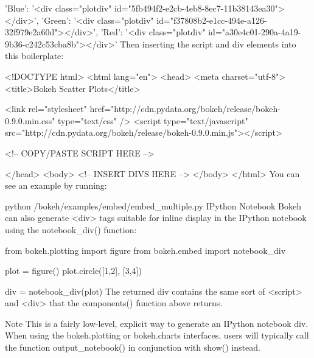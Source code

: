 {'Blue': '<div class="plotdiv" id="5fb494f2-e2cb-4eb8-8ec7-11b38143ea30"></div>', 'Green': '<div class="plotdiv" id="f37808b2-e1cc-494e-a126-32f979e2a60d"></div>', 'Red': '<div class="plotdiv" id="a30e4c01-290a-4a19-9b36-c242c53cba8b"></div>'}
Then inserting the script and div elements into this boilerplate:

<!DOCTYPE html>
<html lang="en">
    <head>
        <meta charset="utf-8">
        <title>Bokeh Scatter Plots</title>

        <link rel="stylesheet" href="http://cdn.pydata.org/bokeh/release/bokeh-0.9.0.min.css" type="text/css" />
        <script type="text/javascript" src="http://cdn.pydata.org/bokeh/release/bokeh-0.9.0.min.js"></script>

        <!-- COPY/PASTE SCRIPT HERE -->

    </head>
    <body>
        <!-- INSERT DIVS HERE -->
    </body>
</html>
You can see an example by running:

python /bokeh/examples/embed/embed_multiple.py
IPython Notebook
Bokeh can also generate <div> tags suitable for inline display in the IPython notebook using the notebook_div() function:

from bokeh.plotting import figure
from bokeh.embed import notebook_div

plot = figure()
plot.circle([1,2], [3,4])

div = notebook_div(plot)
The returned div contains the same sort of <script> and <div> that the components() function above returns.

Note
This is a fairly low-level, explicit way to generate an IPython notebook div. When using the bokeh.plotting or bokeh.charts interfaces, users will typically call the function output_notebook() in conjunction with show() instead.



